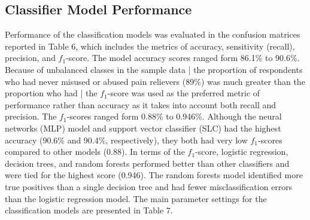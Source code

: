 \documentclass[sigconf]{acmart}
\begin{document}
\subsection{Classifier Model Performance}

Performance of the classification models was evaluated in the confusion 
matrices reported in Table 6, which includes the metrics of accuracy, 
sensitivity (recall), precision, and $f_1$-score. The model accuracy 
scores ranged form 86.1\% to 90.6\%. Because of unbalanced classes in 
the sample data | the proportion of respondents who had never misused or 
abused pain relievers (89\%) was much greater than the proportion who had | 
the $f_1$-score was used as the preferred metric of performance rather 
than accuracy as it takes into account both recall and precision. The 
$f_1$-scores ranged form 0.88\% to 0.946\%. Although the neural networks 
(MLP) model and support vector classifier (SLC) had the highest accuracy 
(90.6\% and 90.4\%, respectively), they both had very low $f_1$-scores 
compared to other models (0.88). In terms of the $f_1$-score, logistic 
regression, decision trees, and random forests performed better than 
other classifiers and were tied for the highest score (0.946). The 
random forests model identified more true positives than a single decision 
tree and had fewer misclassification errors than the logistic regression 
model. The main parameter settings for the classification models are 
presented in Table 7.
 
\end{document}
